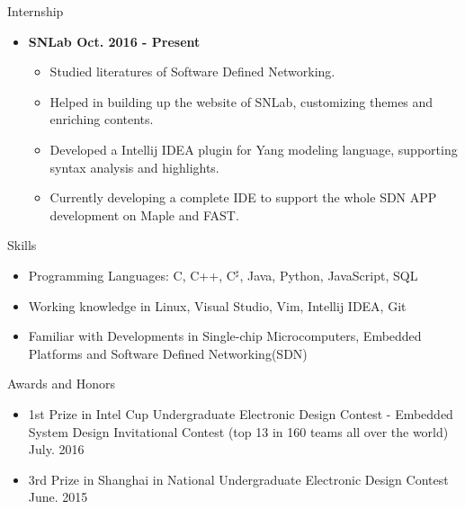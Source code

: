 \documentclass[10pt,oneside]{article}
\newenvironment{ressection}[1]{
	\vspace{4pt}
	{\fontfamily{phv}\selectfont\Large#1}
	\begin{itemize}
	\vspace{3pt}
}{
	\end{itemize}
}
\newcommand{\resitem}[1]{
	\vspace{-4pt}
	\item \begin{flushleft} #1 \end{flushleft}
}
\newcommand{\ressubitem}[1]{
	\vspace{-1pt}
	\item \begin{flushleft} #1 \end{flushleft}
}
\newenvironment{reslist}[1]{
	\resitem{\textbf{#1}}
	\vspace{-5pt}
	\begin{itemize}
}{
	\end{itemize}
}
\begin{document}

\begin{ressection}{Internship}
	\begin{reslist}{SNLab \hfill Oct. 2016 - Present}
		\ressubitem{Studied literatures of Software Defined Networking.}
		\ressubitem{Helped in building up the website of SNLab, customizing themes and enriching contents.}
		\ressubitem{Developed a Intellij IDEA plugin for Yang modeling language, supporting syntax analysis and highlights.}
		\ressubitem{Currently developing a complete IDE to support the whole SDN APP development on Maple and FAST.}
	\end{reslist}
\end{ressection}

\begin{ressection}{Skills}

	\resitem{Programming Languages: C, C++, C$^\sharp$, Java, Python, JavaScript, SQL}
	\resitem{Working knowledge in Linux, Visual Studio, Vim, Intellij IDEA, Git}
	\resitem{Familiar with Developments in Single-chip Microcomputers, Embedded Platforms and Software Defined Networking(SDN)}
	
\end{ressection}




\begin{ressection}{Awards and Honors}
	\resitem{1st Prize in Intel Cup Undergraduate Electronic Design Contest - Embedded System Design Invitational Contest (top 13 in 160 teams all over the world) \hfill July. 2016}
	\resitem{3rd Prize in Shanghai in National Undergraduate Electronic Design Contest \hfill {June. 2015}}
\end{ressection}
\end{document}
